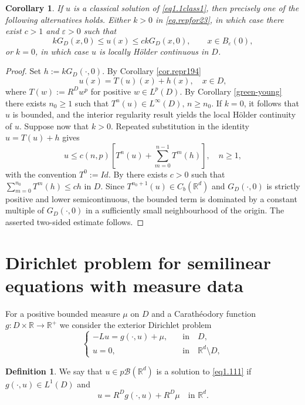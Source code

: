\documentclass[11pt,a4paper,reqno]{amsart}
\newtheorem{corollary}[theorem]{\bf Corollary}
\theoremstyle{definition}
\newtheorem{definition}[theorem]{Definition}
\numberwithin{equation}{section}
\begin{document}
\begin{corollary}
\label{col.clhol}
If \(u\) is a classical solution of \eqref{eq1.1class1}, then precisely one of the following alternatives holds. 
Either \(k>0\) in \eqref{eq.repfor23}, in which case there exist \(c>1\) and \(\varepsilon>0\) such that 
\[
kG_D(x,0)\leq u(x)\leq ckG_D(x,0), \qquad x\in B_\varepsilon(0),
\]
or \(k=0\), in which case \(u\) is locally H\"older continuous in \(D\).
\end{corollary}
\begin{proof}
 Set \(h:=kG_D(\cdot,0)\).  By Corollary \ref{cor.repr194}
\[
u(x)=T(u)(x)+h(x),\quad x\in D,
\]
where  $T(w):= R^Dw^p$ for  positive $w\in L^p(D)$. 
By Corollary \ref{green-young} there exists $n_0\ge 1$ such that $T^n(u)\in L^\infty(D),\, n\ge n_0$.
If \(k=0\), it follows that \(u\) is bounded, and the interior regularity result \cite[Theorem~1.1]{DipierroRosOtonSerraValdinoci2022} 
yields the local H\"older continuity of \(u\). Suppose now that \(k>0\). 
Repeated substitution in the identity \(u=T(u)+h\) gives
\[
u\le c(n,p)\left [T^n(u)+\sum_{m=0}^{n-1}T^m(h)\right],\quad n\ge 1,
\]  
with the convention $T^0:= Id$. By \cite[(1.13)]{GV} there exists $c>0$ such that $\sum_{m=0}^{n_0}T^m(h)\le ch$ in $D$. 
Since $T^{n_0+1}(u)\in C_b(\mathbb R^d)$ and $G_D(\cdot,0)$ is strictly positive and lower semicontinuous, 
the bounded term is dominated by a constant multiple of \(G_D(\cdot,0)\) in a sufficiently small neighbourhood of the origin. 
The asserted two-sided estimate follows.
\end{proof}

\section{Dirichlet problem for semilinear equations with measure data}
\label{sec7}
For a positive bounded  measure $\mu$ 
on $D$ and a Carath\'eodory function $g:D\times\mathbb R \to\mathbb R^+$ we consider the exterior Dirichlet problem 
\begin{equation}
\label{eq1.111}
\begin{cases}
-Lu=g(\cdot,u)+\mu,\quad &\text{in}\quad D, \\
u=0,\quad &\text{in}\quad\mathbb{R}^d\setminus D,
\end{cases}
\end{equation}




\begin{definition}
We say that $u\in p\mathscr B(\mathbb R^d)$ is a solution to \eqref{eq1.111}
if $g(\cdot,u)\in L^1(D)$ and 
\[
u=R^Dg(\cdot,u)+R^D\mu\quad\text{in }\mathbb R^d.
\]
\end{definition} 
\end{document}
